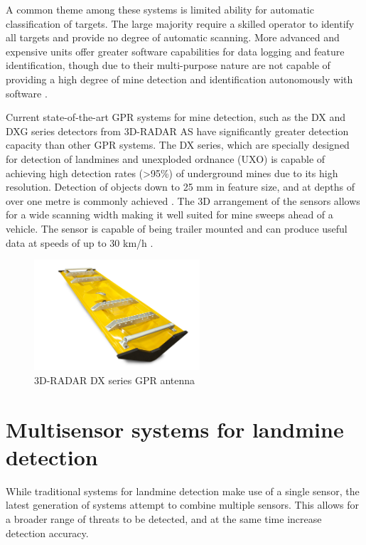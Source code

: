 \documentclass[main.tex]{subfiles}
\begin{document}
\begin{appendices}
A common theme among these systems is limited ability for automatic classification of targets. The large majority require a skilled operator to identify all targets and provide no degree of automatic scanning. More advanced and expensive units offer greater software capabilities for data logging and feature identification, though due to their multi-purpose nature are not capable of providing a high degree of mine detection and identification autonomously with software \parencite{rd8000}.

Current state-of-the-art GPR systems for mine detection, such as the DX and DXG series detectors from 3D-RADAR AS have significantly greater detection capacity than other GPR systems. The DX series, which are specially designed for detection of landmines and unexploded ordnance (UXO) is capable of achieving high detection rates (>95\%) of underground mines due to its high resolution. Detection of objects down to 25 mm in feature size, and at depths of over one metre is commonly achieved \parencite{3dradarDX}. The 3D arrangement of the sensors allows for a wide scanning width making it well suited for mine sweeps ahead of a vehicle. The sensor is capable of being trailer mounted and can produce useful data at speeds of up to 30 km/h \parencite{3dradarDX}.

\begin{figure}[ht]
\centering
\includegraphics[width=0.55\textwidth]{8-Appendices/DX-Series-Antenna-Profile.jpg}
\caption[3D-RADAR DX series GPR antenna]{3D-RADAR DX series GPR antenna \parencite{3dradarDX}}
\end{figure}

\section*{Multisensor systems for landmine detection}
While traditional systems for landmine detection make use of a single sensor, the latest generation of systems attempt to combine multiple sensors. This allows for a broader range of threats to be detected, and at the same time increase detection accuracy.  


\end{appendices}
\end{document}
